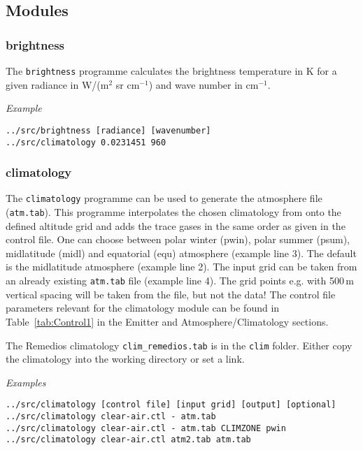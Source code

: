 \subsection{Modules}

\subsubsection{brightness}
The \texttt{brightness} programme calculates the brightness temperature in K for a given radiance in W/(m$^2$ sr cm$^{-1}$) and wave number in cm$^{-1}$.

\emph{Example}\linebreak
\begin{verbatim}
../src/brightness [radiance] [wavenumber]
../src/climatology 0.0231451 960
\end{verbatim}

\subsubsection{climatology}
\label{sec:ModuleClimatology}
The \texttt{climatology} programme can be used to generate the atmosphere file (\texttt{atm.tab}). This programme interpolates the chosen climatology from \citet{Remedios2007} onto the defined altitude grid and adds the trace gases in the same order as given in the control file. One can choose between polar winter (pwin), polar summer (psum), midlatitude (midl) and equatorial (equ) atmosphere (example line 3). The default is the midlatitude atmosphere (example line 2). The input grid can be taken from an already existing \texttt{atm.tab} file (example line 4). The grid points e.g. with 500\,m vertical spacing will be taken from the file, but not the data! The control file parameters relevant for the climatology module can be found in Table~\ref{tab:Control1} in the Emitter and Atmosphere/Climatology sections.

The Remedios climatology \texttt{clim\_remedios.tab} is in the \texttt{clim} folder. Either copy the climatology into the working directory or set a link.

\emph{Examples}\linebreak
\begin{verbatim}
../src/climatology [control file] [input grid] [output] [optional]
../src/climatology clear-air.ctl - atm.tab
../src/climatology clear-air.ctl - atm.tab CLIMZONE pwin
../src/climatology clear-air.ctl atm2.tab atm.tab
\end{verbatim}


